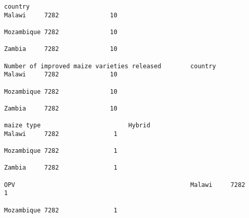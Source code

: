 \documentclass[11pt]{article}
\begin{document}
\begin{Verbatim}[commandchars=\\\{\}]
                                                                                                                            country                                                                              Malawi     7282              10  
                                                                                                                                                                                                                 Mozambique 7282              10  
                                                                                                                                                                                                                 Zambia     7282              10  
                                                                         Number of improved maize varieties released        country                                                                              Malawi     7282              10  
                                                                                                                                                                                                                 Mozambique 7282              10  
                                                                                                                                                                                                                 Zambia     7282              10  
                                                                                                                            maize type                        Hybrid                                             Malawi     7282               1  
                                                                                                                                                                                                                 Mozambique 7282               1  
                                                                                                                                                                                                                 Zambia     7282               1  
                                                                                                                                                              OPV                                                Malawi     7282               1  
                                                                                                                                                                                                                 Mozambique 7282               1  

\end{Verbatim}
\end{document}
